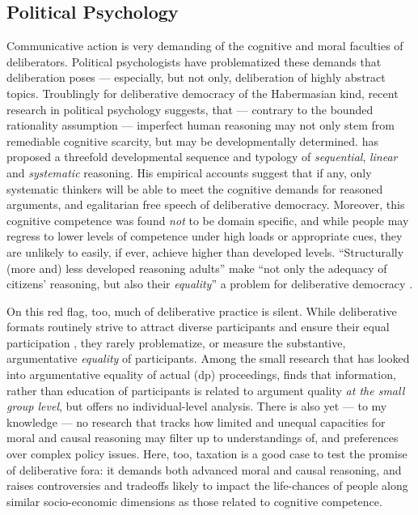 \subsection{Political Psychology}
Communicative action is very demanding of the cognitive and moral faculties of deliberators.
Political psychologists have problematized these demands that deliberation poses \citep{Rosenberg-2002-aa} --- especially, but not only, deliberation of highly abstract topics.
Troublingly for deliberative democracy of the Habermasian kind, recent research in political psychology suggests, that --- contrary to the bounded rationality assumption \citep[for example,][]{Simon-1999-aa,Kahneman2011} --- imperfect human reasoning may not only stem from remediable cognitive scarcity, but may be developmentally determined.
\citet{Rosenberg-2002-aa} has proposed a threefold developmental sequence and typology of \emph{sequential}, \emph{linear} and \emph{systematic} reasoning.
His empirical accounts suggest that if any, only systematic thinkers will be able to meet the cognitive demands for reasoned arguments, and egalitarian free speech of deliberative democracy.
Moreover, this cognitive competence was found \emph{not} to be domain specific, and while people may regress to lower levels of competence under high loads or appropriate cues, they are unlikely to easily, if ever, achieve higher than developed levels.
``Structurally (more and) less developed reasoning adults'' make ``not only the adequacy of citizens' reasoning, but also their \emph{equality}'' a problem for deliberative democracy \citep[12, emphasis added]{Rosenberg-2007-aa}.

On this red flag, too, much of deliberative practice is silent.
While deliberative formats routinely strive to attract diverse participants and ensure their equal participation \citep{Fishkin2009}, they rarely problematize, or measure the substantive, argumentative \emph{equality} of participants.
Among the small research that has looked into argumentative equality of actual (\gls{dp}) proceedings, \cite{Siu} finds that information, rather than education of participants is related to argument quality \emph{at the small group level}, but offers no individual-level analysis.
There is also yet --- to my knowledge --- no research that tracks how limited and unequal capacities for moral and causal reasoning may filter up to understandings of, and preferences over complex policy issues.
Here, too, taxation is a good case to test the promise of deliberative fora:
it demands both advanced moral and causal reasoning, and raises controversies and tradeoffs likely to impact the life-chances of people along similar socio-economic dimensions as those related to cognitive competence.

